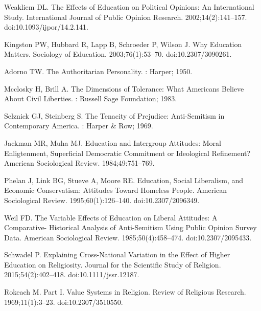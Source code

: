 \documentclass[10pt,letterpaper]{article}
\begin{document}
\begin{thebibliography}{10}
Weakliem DL.
\newblock The {{Effects}} of {{Education}} on {{Political Opinions}}: {{An
  International Study}}.
\newblock International Journal of Public Opinion Research.
  2002;14(2):141--157.
\newblock doi:{10.1093/ijpor/14.2.141}.

Kingston PW, Hubbard R, Lapp B, Schroeder P, Wilson J.
\newblock Why {{Education Matters}}.
\newblock Sociology of Education. 2003;76(1):53--70.
\newblock doi:{10.2307/3090261}.

Adorno TW.
\newblock The {{Authoritarian Personality}}.
: {Harper}; 1950.

Mcclosky H, Brill A.
\newblock The {{Dimensions}} of {{Tolerance}}: {{What Americans Believe About
  Civil Liberties}}.
: {Russell Sage Foundation}; 1983.

Selznick GJ, Steinberg S.
\newblock The {{Tenacity}} of {{Prejudice}}: Anti-{{Semitism}} in
  {{Contemporary America}}.
: {Harper \& Row}; 1969.

Jackman MR, Muha MJ.
\newblock Education and {{Intergroup Attitudes}}: {{Moral Enligtenment}},
  {{Superficial Democratic Commitment}} or {{Ideological Refinement}}?
\newblock American Sociological Review. 1984;49:751--769.

Phelan J, Link BG, Stueve A, Moore RE.
\newblock Education, {{Social Liberalism}}, and {{Economic Conservatism}}:
  {{Attitudes Toward Homeless People}}.
\newblock American Sociological Review. 1995;60(1):126--140.
\newblock doi:{10.2307/2096349}.

Weil FD.
\newblock The {{Variable Effects}} of {{Education}} on {{Liberal Attitudes}}:
  {{A Comparative}}- {{Historical Analysis}} of {{Anti}}-{{Semitism Using
  Public Opinion Survey Data}}.
\newblock American Sociological Review. 1985;50(4):458--474.
\newblock doi:{10.2307/2095433}.

Schwadel P.
\newblock Explaining {{Cross}}-{{National Variation}} in the {{Effect}} of
  {{Higher Education}} on {{Religiosity}}.
\newblock Journal for the Scientific Study of Religion. 2015;54(2):402--418.
\newblock doi:{10.1111/jssr.12187}.

Rokeach M.
\newblock Part {{I}}. {{Value Systems}} in {{Religion}}.
\newblock Review of Religious Research. 1969;11(1):3--23.
\newblock doi:{10.2307/3510550}.


\end{thebibliography}
\end{document}
